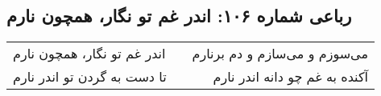 \begin{center}
\section*{رباعی شماره ۱۰۶: اندر غم تو نگار، همچون نارم}
\label{sec:106}
\begin{longtable}{l p{0.5cm} r}
اندر غم تو نگار، همچون نارم
&&
می‌سوزم و می‌سازم و دم برنارم
\\
تا دست به گردن تو اندر نارم
&&
آکنده به غم چو دانه اندر نارم
\\
\end{longtable}
\end{center}
